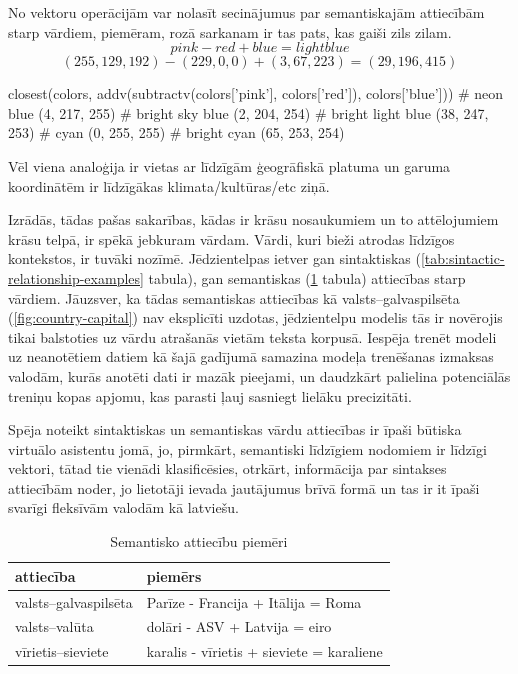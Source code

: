 No vektoru operācijām var nolasīt secinājumus par semantiskajām attiecībām starp vārdiem, piemēram, rozā sarkanam ir tas pats, kas gaiši zils zilam.
$$pink - red + blue = light blue$$
$$(255, 129, 192) - (229, 0, 0) + (3, 67, 223) = (29, 196, 415)$$
\begin{python}
closest(colors, addv(subtractv(colors['pink'], colors['red']), colors['blue']))
# neon blue (4, 217, 255)
# bright sky blue (2, 204, 254)
# bright light blue (38, 247, 253)
# cyan (0, 255, 255)
# bright cyan (65, 253, 254)
\end{python}

Vēl viena analoģija ir vietas ar līdzīgām ģeogrāfiskā platuma un garuma koordinātēm ir līdzīgākas klimata/kultūras/etc ziņā. %

Izrādās, tādas pašas sakarības, kādas ir krāsu nosaukumiem un to attēlojumiem krāsu telpā, ir spēkā jebkuram vārdam. Vārdi, kuri bieži atrodas līdzīgos kontekstos, ir tuvāki nozīmē. Jēdzientelpas ietver gan sintaktiskas (\ref{tab:sintactic-relationship-examples} tabula), gan semantiskas (\ref{tab:semantic-relationship-examples} tabula) attiecības starp vārdiem. Jāuzsver, ka tādas semantiskas attiecības kā valsts--galvaspilsēta (\ref{fig:country-capital}) nav eksplicīti uzdotas, jēdzientelpu modelis tās ir novērojis tikai balstoties uz vārdu atrašanās vietām teksta korpusā. Iespēja trenēt modeli uz neanotētiem datiem kā šajā gadījumā samazina modeļa trenēšanas izmaksas valodām, kurās anotēti dati ir mazāk pieejami, un daudzkārt palielina potenciālās treniņu kopas apjomu, kas parasti ļauj sasniegt lielāku precizitāti.


Spēja noteikt sintaktiskas un semantiskas vārdu attiecības ir īpaši būtiska virtuālo asistentu jomā, jo, pirmkārt, semantiski līdzīgiem nodomiem ir līdzīgi vektori, tātad tie vienādi klasificēsies, otrkārt, informācija par sintakses attiecībām noder, jo lietotāji ievada jautājumus brīvā formā un tas ir it īpaši svarīgi fleksīvām valodām kā latviešu.



\begin{table}[htbp]
	\centering
	\caption{Semantisko attiecību piemēri \cite{word2vec2013}}
	\begin{tabular}{ll}\toprule
		attiecība & piemērs  \\\midrule
		valsts--galvaspilsēta   & Parīze - Francija + Itālija = Roma \\
		valsts--valūta   & dolāri - ASV + Latvija = eiro \\
		vīrietis--sieviete   & karalis - vīrietis + sieviete = karaliene \\\bottomrule
	\end{tabular}%
	\label{tab:semantic-relationship-examples}%
\end{table}

